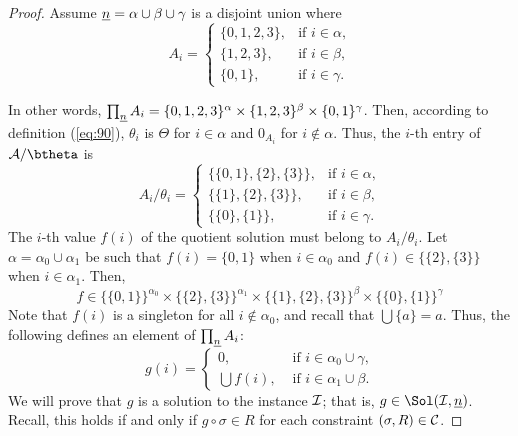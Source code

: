 \begin{example}
\begin{proof}
  Assume $\underline{n} = \alpha\cup \beta \cup \gamma$ is a disjoint union where
  \[ A_i = 
  \begin{cases}
    \{0,1,2,3\},  & \text{if $i \in \alpha$,}\\
    \{1,2,3\}, & \text{if $i \in \beta$,}\\
    \{0,1\}, & \text{if $i \in \gamma$.}
  \end{cases}
  \]
  
  In other words,
  $\prod_{\underline{n}} A_i = \{0,1,2,3\}^\alpha \times \{1,2,3\}^\beta \times \{0,1\}^\gamma$.
  Then, according to definition (\ref{eq:90}),
  $\theta_i$ is $\Theta$ for $i \in \alpha$ and $0_{A_i}$ for $i\notin \alpha$.
  Thus, the $i$-th entry of $\sA/\btheta$ is
  \[
  A_i/\theta_i = 
  \begin{cases}
    \{\{0,1\}, \{2\}, \{3\}\},  & \text{if $i \in \alpha$,}\\
    \{\{1\},\{2\},\{3\}\}, & \text{if $i \in \beta$,}\\
    \{\{0\},\{1\}\}, & \text{if $i \in \gamma$.}
  \end{cases}
  \]
  The $i$-th value $f(i)$ of the quotient solution must belong to 
  $A_i/\theta_i$.
  Let $\alpha = \alpha_0 \cup \alpha_1$ be such that 
  $f(i) = \{0,1\}$ when $i \in \alpha_0$ and
  $f(i) \in\{ \{2\}, \{3\}\}$ when $i \in \alpha_1$. Then,
  \begin{equation}
    \label{eq:10}
  f \in \{\{0,1\}\}^{\alpha_0} \times \{\{2\}, \{3\}\}^{\alpha_1} \times
  \{\{1\},\{2\},\{3\}\}^{\beta} \times 
  \{\{0\},\{1\}\}^{\gamma}
  \end{equation}
  Note that $f(i)$ is a singleton for all $i \notin \alpha_0$, and recall that
  $\bigcup \{a\}= a$. Thus, the following defines an element of $\prod_{\underline{n}}A_i$:
  \[
  g(i) = 
  \begin{cases}
    0, &  \text{ if $i \in \alpha_0\cup \gamma$,}\\ 
    \bigcup f(i), &  \text{ if $i\in \alpha_1 \cup \beta$.}
  \end{cases}
  \]
  We will prove that $g$ is a solution to the instance $\mathcal{I}$; that is,
  $g\in \Sol(\sI, \nn)$. Recall, this holds if and only if $g \circ \sigma \in R$
  for each constraint $(\sigma, R) \in \mathcal{C}$.
  

\end{proof}
\end{example}
